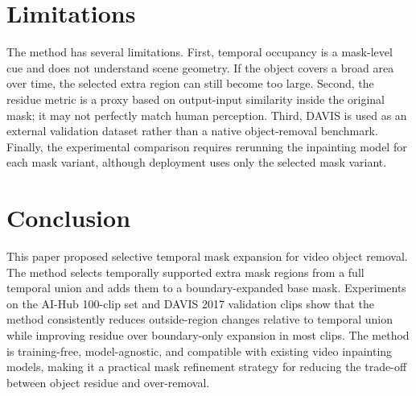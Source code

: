 \documentclass[nouppercase]{kaia}
\begin{document}
\section{Limitations}
The method has several limitations. First, temporal occupancy is a mask-level cue and does not understand scene geometry. If the object covers a broad area over time, the selected extra region can still become too large. Second, the residue metric is a proxy based on output-input similarity inside the original mask; it may not perfectly match human perception. Third, DAVIS is used as an external validation dataset rather than a native object-removal benchmark. Finally, the experimental comparison requires rerunning the inpainting model for each mask variant, although deployment uses only the selected mask variant.

\section{Conclusion}
This paper proposed selective temporal mask expansion for video object removal. The method selects temporally supported extra mask regions from a full temporal union and adds them to a boundary-expanded base mask. Experiments on the AI-Hub 100-clip set and DAVIS 2017 validation clips show that the method consistently reduces outside-region changes relative to temporal union while improving residue over boundary-only expansion in most clips. The method is training-free, model-agnostic, and compatible with existing video inpainting models, making it a practical mask refinement strategy for reducing the trade-off between object residue and over-removal.



\newpage
\newpage
\end{document}
